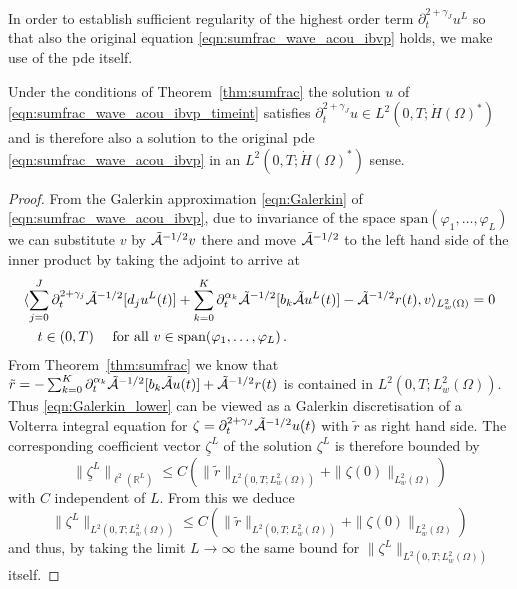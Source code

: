 In order to establish sufficient regularity of the highest order term $\partial_t^{2+\gamma_J} u^L$ so that also the original equation \eqref{eqn:sumfrac_wave_acou_ibvp} holds, we make use of the {\sc pde} itself. 
\begin{corollary}
Under the conditions of Theorem~\ref{thm:sumfrac} 
the solution $u$ of \eqref{eqn:sumfrac_wave_acou_ibvp_timeint} 
satisfies $\partial_t^{2+\gamma_J} u\in L^2(0,T;\dot{H}(\Omega)^*)$ and is therefore also a solution to the original {\sc pde} \eqref{eqn:sumfrac_wave_acou_ibvp} in an $L^2(0,T;\dot{H}(\Omega)^*)$ sense.
\end{corollary}
\begin{proof}
From the Galerkin approximation \eqref{eqn:Galerkin} of \eqref{eqn:sumfrac_wave_acou_ibvp}, due to invariance of the space $\mbox{span}(\varphi_1,\ldots, \varphi_L)$ we can substitute $v$ by $\tilde{\mathcal{A}}^{-1/2}v$ there and move $\tilde{\mathcal{A}}^{-1/2}$ to the left hand side of the inner product by taking the adjoint
to arrive at 
\begin{equation}\label{eqn:Galerkin_lower}
\begin{aligned}
&\langle \sum_{j=0}^J \partial_t^{2+\gamma_j}\tilde{\mathcal{A}}^{-1/2}[d_j  u^L(t)] + \sum_{k=0}^K \partial_t^{\alpha_k} \tilde{\mathcal{A}}^{-1/2}[b_k  
\tilde{\mathcal{A}} u^L(t)] - \tilde{\mathcal{A}}^{-1/2}r(t),v\rangle_{L^2_w(\Omega)} = 0 \\
&\quad t\in(0,T) \quad \mbox{ for all }v\in\mbox{span}(\varphi_1,\ldots, \varphi_L)\,.
\end{aligned}
\end{equation}
From Theorem~\ref{thm:sumfrac} we know that 
$\tilde{r}=-\sum_{k=0}^K \partial_t^{\alpha_k} \tilde{\mathcal{A}}^{-1/2}[b_k  \tilde{\mathcal{A}} u(t)] + \tilde{\mathcal{A}}^{-1/2}r(t)$ is contained in $L^2(0,T;L^2_w(\Omega))$. 
Thus \eqref{eqn:Galerkin_lower} can be viewed as a Galerkin discretisation of a Volterra integral equation for $\zeta =  \partial_t^{2+\gamma_J}\tilde{\mathcal{A}}^{-1/2} u(t)$ with $\tilde{r}$ as right hand side. The corresponding coefficient vector $\underline{\zeta}^L$ of the solution $\zeta^L$ is therefore bounded by 
\[
\|\underline{\zeta}^L\|_{\ell^2(\mathbb{R}^L)}
\leq C(\|\tilde{r}\|_{L^2(0,T;L^2_w(\Omega))}+\|\zeta(0)\|_{L^2_w(\Omega)})
\]
with $C$ independent of $L$. From this we deduce 
\[ \|\zeta^L\|_{L^2(0,T;L^2_w(\Omega))}
\leq C(\|\tilde{r}\|_{L^2(0,T;L^2_w(\Omega))}+\|\zeta(0)\|_{L^2_w(\Omega)})
\]
and thus, by taking the limit $L\to\infty$ the same bound for $\|\zeta^L\|_{L^2(0,T;L^2_w(\Omega))}$ itself.
\end{proof}


